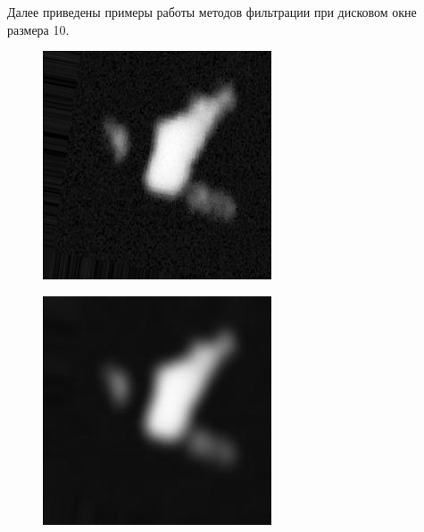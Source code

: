 \newpage

Далее приведены примеры работы методов фильтрации при дисковом окне размера 10.

\begin{figure}[h!]
	\centering
	\begin{minipage}{.5\textwidth}
		\centering
		\includegraphics[width=0.8\linewidth]{inc/img/nc_original}
		\label{fig:nc_original_1}
	\end{minipage}%
	\begin{minipage}{.5\textwidth}
		\centering
		\includegraphics[width=0.8\linewidth]{inc/img/nc_mean_d10}
		\label{fig:nc_mean_d10}
	\end{minipage}
\end{figure}

